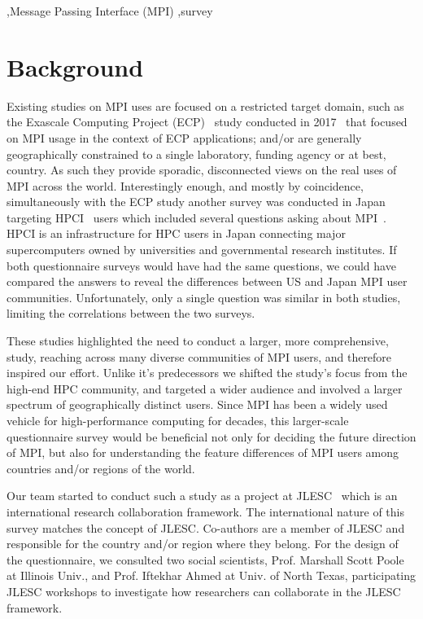 \documentclass[preprint,5p,times]{elsarticle}
\newcommand{\revision}[2]{{\color{blue}#2}}
\begin{document}
\begin{keyword}
   \sep Message Passing Interface (MPI) \sep survey
\end{keyword}

\maketitle

\section{Background}\label{sec:background}

Existing studies on MPI uses are focused on a restricted target
domain, such as the Exascale Computing Project (ECP)~\cite{ECP} study
conducted in 2017~\cite{ECP-survey} that focused
on MPI usage in the
context of ECP applications; and/or are generally geographically
constrained to a single laboratory, funding agency or at best,
country. As such they provide sporadic, disconnected views on the real
uses of MPI across the world.
%
Interestingly enough, and mostly by coincidence, simultaneously with
the ECP study another survey was conducted in Japan targeting
HPCI~\cite{HPCI} users which included several questions asking about
MPI~\cite{hpci-user-survey}.  HPCI is an infrastructure for HPC users
in Japan connecting major supercomputers owned by universities and
governmental research institutes. If both questionnaire surveys would
have \revision{}{had} the same questions, we could have compared the answers to reveal
the differences between US and Japan MPI user
communities. Unfortunately, \revision{}{only} a single question was similar in both
studies, limiting the correlations between the two surveys.

These studies highlighted the need to conduct a larger, more comprehensive,
study, reaching across many diverse \revision{community}{communities} of MPI users, and therefore
inspired our effort. Unlike it's predecessors we shifted the study's focus from
the high-end HPC community, and targeted a wider audience and involved a larger
spectrum of geographically distinct users. Since MPI has been a widely used
vehicle for high-performance computing for decades, this larger-scale
questionnaire survey would be beneficial not only for deciding the future
direction of MPI, but also for understanding the feature differences of MPI
users among countries and/or regions of the world.

Our team started to conduct such a study as a project at
JLESC~\cite{JLESC} which is an international research collaboration
framework. The international nature of this survey matches the concept
of JLESC. Co-authors are a member of JLESC and responsible for the
country and/or region where they belong. For the design of the questionnaire,
we consulted two social scientists, Prof. Marshall Scott Poole at
Illinois Univ., and Prof. Iftekhar Ahmed at Univ. of North Texas,
participating JLESC workshops to investigate how researchers can
collaborate in the JLESC framework.
\end{document}
